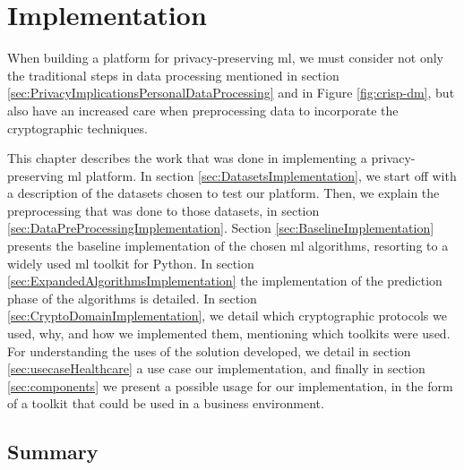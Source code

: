%

\acresetall

\chapter{Implementation}
\label{ch:Implementation}

When building a platform for privacy-preserving \ac{ml}, we must consider not only the traditional steps in data processing mentioned in section \ref{sec:PrivacyImplicationsPersonalDataProcessing} and in Figure \ref{fig:crisp-dm}, but also have an increased care when preprocessing data to incorporate the cryptographic techniques.

This chapter describes the work that was done in implementing a privacy-preserving \ac{ml} platform. In section \ref{sec:DatasetsImplementation}, we start off with a description of the datasets chosen to test our platform. Then, we explain the preprocessing that was done to those datasets, in section \ref{sec:DataPreProcessingImplementation}.
Section \ref{sec:BaselineImplementation} presents the baseline implementation of the chosen \ac{ml} algorithms, resorting to a widely used \ac{ml} toolkit for Python.
In section \ref{sec:ExpandedAlgorithmsImplementation} the implementation of the prediction phase of the algorithms is detailed.
In section \ref{sec:CryptoDomainImplementation}, we detail which cryptographic protocols we used, why, and how we implemented them, mentioning which toolkits were used.
For understanding the uses of the solution developed, we detail in section \ref{sec:usecaseHealthcare} a use case our implementation, and finally in section \ref{sec:components} we present a possible usage for our implementation, in the form of a toolkit that could be used in a business environment.










  
\section{Summary}
\label{sec:SummaryImplementation}


